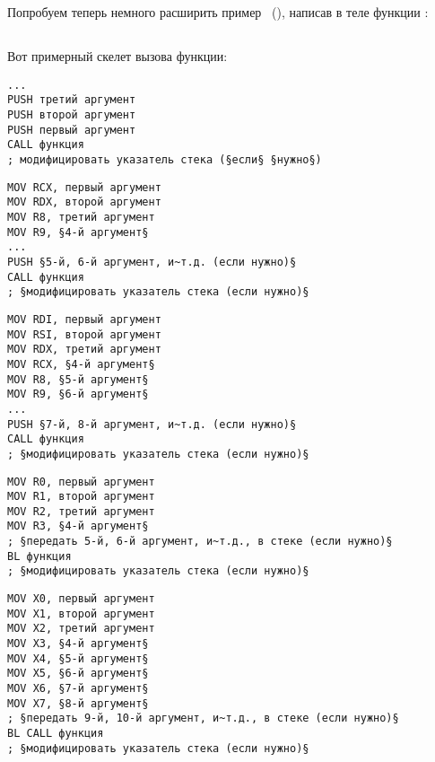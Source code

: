 \section{\PrintfSeveralArgumentsSectionName}

Попробуем теперь немного расширить пример \IT{\HelloWorldSectionName}~(),
написав в теле функции \main:







\subsection{\Conclusion{}}

Вот примерный скелет вызова функции:

\begin{lstlisting}[caption=x86,style=customasmx86]
...
PUSH третий аргумент
PUSH второй аргумент
PUSH первый аргумент
CALL функция
; модифицировать указатель стека (§если§ §нужно§)
\end{lstlisting}

\begin{lstlisting}[caption=x64 (MSVC),style=customasmx86]
MOV RCX, первый аргумент
MOV RDX, второй аргумент
MOV R8, третий аргумент
MOV R9, §4-й аргумент§
...
PUSH §5-й, 6-й аргумент, и~т.д. (если нужно)§
CALL функция
; §модифицировать указатель стека (если нужно)§
\end{lstlisting}

\begin{lstlisting}[caption=x64 (GCC),style=customasmx86]
MOV RDI, первый аргумент
MOV RSI, второй аргумент
MOV RDX, третий аргумент
MOV RCX, §4-й аргумент§
MOV R8, §5-й аргумент§
MOV R9, §6-й аргумент§
...
PUSH §7-й, 8-й аргумент, и~т.д. (если нужно)§
CALL функция
; §модифицировать указатель стека (если нужно)§
\end{lstlisting}

\begin{lstlisting}[caption=ARM,style=customasmARM]
MOV R0, первый аргумент
MOV R1, второй аргумент
MOV R2, третий аргумент
MOV R3, §4-й аргумент§
; §передать 5-й, 6-й аргумент, и~т.д., в стеке (если нужно)§
BL функция
; §модифицировать указатель стека (если нужно)§
\end{lstlisting}

\begin{lstlisting}[caption=ARM64,style=customasmARM]
MOV X0, первый аргумент
MOV X1, второй аргумент
MOV X2, третий аргумент
MOV X3, §4-й аргумент§
MOV X4, §5-й аргумент§
MOV X5, §6-й аргумент§
MOV X6, §7-й аргумент§
MOV X7, §8-й аргумент§
; §передать 9-й, 10-й аргумент, и~т.д., в стеке (если нужно)§
BL CALL функция
; §модифицировать указатель стека (если нужно)§
\end{lstlisting}

